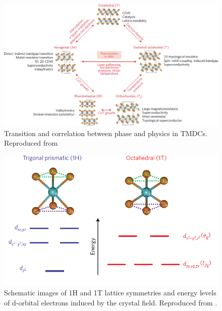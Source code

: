 \begin{figure}[!h]
	\begin{center}
		\includegraphics[scale=0.3]{1T'/TMDCPhases.png}
		\caption{Transition and correlation between phase and physics in TMDCs. Reproduced from \cite{Yang2017}}
		\label{fig:1T'TMDCPhases}
	\end{center}
\end{figure}

\begin{figure}[!h]
	\begin{center}
		\includegraphics[scale=0.5]{1T'/EnergyDiagram.png}
		\caption{Schematic images of 1H and 1T lattice symmetries and energy levels of d-orbital electrons induced by the crystal field. Reproduced from \cite{Yang2017}.}
		\label{fig:1T'EnergyDiagram}
	\end{center}
\end{figure}

